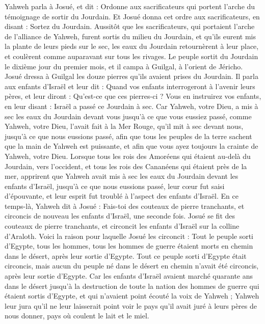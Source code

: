 \begin{multicols}{2}
Yahweh parla à Josué, et dit :
Ordonne aux sacrificateurs qui portent l’arche du témoignage de sortir du Jourdain.
Et Josué donna cet ordre aux sacrificateurs, en disant : Sortez du Jourdain.
Aussitôt que les sacrificateurs, qui portaient l’arche de l’alliance de Yahweh, furent sortis du milieu du Jourdain, et qu’ils eurent mis la plante de leurs pieds sur le sec, les eaux du Jourdain retournèrent à leur place, et coulèrent comme auparavant sur tous les rivages.
Le peuple sortit du Jourdain le dixième jour du premier mois, et il campa à Guilgal, à l’orient de Jéricho.
Josué dressa à Guilgal les douze pierres qu’ils avaient prises du Jourdain.
Il parla aux enfants d’Israël et leur dit : Quand vos enfants interrogeront à l’avenir leurs pères, et leur diront : Qu’est-ce que ces pierres-ci ?
Vous en instruirez vos enfants, en leur disant : Israël a passé ce Jourdain à sec.
Car Yahweh, votre Dieu, a mis à sec les eaux du Jourdain devant vous jusqu’à ce que vous eussiez passé, comme Yahweh, votre Dieu, l’avait fait à la Mer Rouge, qu’il mit à sec devant nous, jusqu’à ce que nous eussions passé,
afin que tous les peuples de la terre sachent que la main de Yahweh est puissante, et afin que vous ayez toujours la crainte de Yahweh, votre Dieu.
\VerseOne{}Lorsque tous les rois des Amoréens qui étaient au-delà du Jourdain, vers l’occident, et tous les rois des Cananéens qui étaient près de la mer, apprirent que Yahweh avait mis à sec les eaux du Jourdain devant les enfants d’Israël, jusqu’à ce que nous eussions passé, leur cœur fut saisi d’épouvante, et leur esprit fut troublé à l’aspect des enfants d’Israël.
En ce temps-là, Yahweh dit à Josué : Fais-toi des couteaux de pierre tranchants, et circoncis de nouveau les enfants d’Israël, une seconde fois.
Josué se fit des couteaux de pierre tranchants, et circoncit les enfants d’Israël sur la colline d’Araloth.
Voici la raison pour laquelle Josué les circoncit : Tout le peuple sorti d’Egypte, tous les hommes, tous les hommes de guerre étaient morts en chemin dans le désert, après leur sortie d’Egypte.
Tout ce peuple sorti d’Egypte était circoncis, mais aucun du peuple né dans le désert en chemin n’avait été circoncis, après leur sortie d’Egypte.
Car les enfants d’Israël avaient marché quarante ans dans le désert jusqu’à la destruction de toute la nation des hommes de guerre qui étaient sortis d’Egypte, et qui n’avaient point écouté la voix de Yahweh ; Yahweh leur jura qu’il ne leur laisserait point voir le pays qu’il avait juré à leurs pères de nous donner, pays où coulent le lait et le miel.

\end{multicols}

